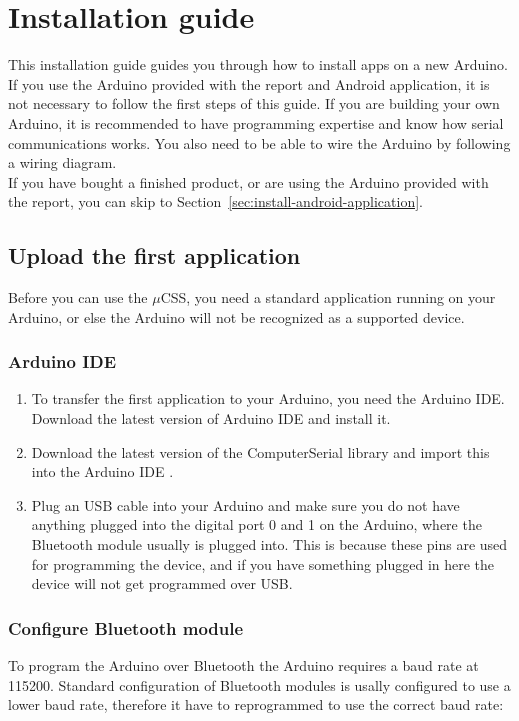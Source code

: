 \chapter{Installation guide}
This installation guide guides you through how to install apps on a new Arduino. If you use the Arduino provided with the report and Android application, it is not necessary to follow the first steps of this guide. If you are building your own Arduino, it is recommended to have programming expertise and know how serial communications works. You also need to be able to wire the Arduino by following a wiring diagram. \\

If you have bought a finished product, or are using the Arduino provided with the report, you can skip to Section~\ref{sec:install-android-application}.

	\section{Upload the first application}
	Before you can use the $\mu$CSS, you need a standard application running on your Arduino, or else the Arduino will not be recognized as a supported device.
	
		\subsection{Arduino IDE}
		\begin{enumerate}
		\item To transfer the first application to your Arduino, you need the Arduino IDE. Download the latest version of Arduino IDE \cite{download-arduino} and install it.
	
		\item Download the latest version of the ComputerSerial library \cite{download-computerserial} and import this into the Arduino IDE \cite{import-libraries}.
	
		\item Plug an USB cable into your Arduino and make sure you do not have anything plugged into the digital port 0 and 1 on the Arduino, where the Bluetooth module usually is plugged into. This is because these pins are used for programming the device, and if you have something plugged in here the device will not get programmed over USB.
		\end{enumerate}
		
				
		\subsection{Configure Bluetooth module}
		To program the Arduino over Bluetooth the Arduino requires a baud rate at 115200. Standard configuration of Bluetooth modules is usally configured to use a lower baud rate, therefore it have to reprogrammed to use the correct baud rate:\\
		
